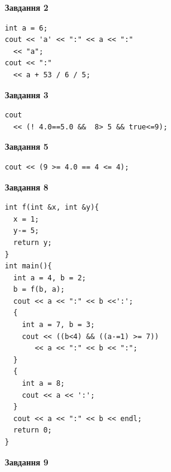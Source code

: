 \documentclass[12pt, ukrainian]{article}
\begin{document}
{\begin {large}
\begin{minipage}[t]{7.0cm}
\end{minipage}
\vline \hspace{1mm}
\begin{minipage}[t]{11.0cm}

\begin{center}
\textbf{Завдання 2}
\end{center}
\vspace{-8mm}

\begin{verbatim}
int a = 6;
cout << 'a' << ":" << a << ":" 
  << "a";
cout << ":" 
  << a + 53 / 6 / 5;
\end{verbatim}



\begin{center}
\textbf{Завдання 3}
\end{center}
\vspace{-8mm}

\begin{verbatim}
cout 
  << (! 4.0==5.0 &&  8> 5 && true<=9);
\end{verbatim}



\begin{center}
\textbf{Завдання 5}
\end{center}
\vspace{-8mm}

\begin{verbatim}
cout << (9 >= 4.0 == 4 <= 4);
\end{verbatim}



\begin{center}
\textbf{Завдання 8}
\end{center}
\vspace{-8mm}

\begin{verbatim}
int f(int &x, int &y){
  x = 1;
  y-= 5;
  return y;
}
int main(){
  int a = 4, b = 2;
  b = f(b, a);
  cout << a << ":" << b <<':';
  {
    int a = 7, b = 3;
    cout << ((b<4) && ((a-=1) >= 7))
       << a << ":" << b << ":";
  }
  {
    int a = 8;
    cout << a << ':';
  }
  cout << a << ":" << b << endl;
  return 0;
}
\end{verbatim}

\end{minipage}


\begin{minipage}[t]{7.0cm}

\begin{center}
\textbf{Завдання 9}
\end{center}
\vspace{-8mm}


\end{minipage}
\end{large}}
\end{document}

